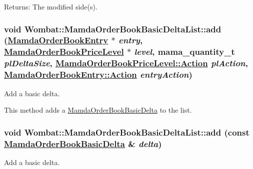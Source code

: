 \begin{Desc}
\item[Returns:]The modified side(s). \end{Desc}
\hypertarget{classWombat_1_1MamdaOrderBookBasicDeltaList_6395c7929cb591aac5b91721fd11f163}{
\subsubsection[add]{\setlength{\rightskip}{0pt plus 5cm}void Wombat::Mamda\-Order\-Book\-Basic\-Delta\-List::add (\hyperlink{classWombat_1_1MamdaOrderBookEntry}{Mamda\-Order\-Book\-Entry} $\ast$ {\em entry}, \hyperlink{classWombat_1_1MamdaOrderBookPriceLevel}{Mamda\-Order\-Book\-Price\-Level} $\ast$ {\em level}, mama\_\-quantity\_\-t {\em pl\-Delta\-Size}, \hyperlink{classWombat_1_1MamdaOrderBookPriceLevel_bd3407b4250fc6f7a42d94b6d32e358a}{Mamda\-Order\-Book\-Price\-Level::Action} {\em pl\-Action}, \hyperlink{classWombat_1_1MamdaOrderBookEntry_fc6cb1d67c7601d093a36f59cf9bcef4}{Mamda\-Order\-Book\-Entry::Action} {\em entry\-Action})}}
\label{classWombat_1_1MamdaOrderBookBasicDeltaList_6395c7929cb591aac5b91721fd11f163}


Add a basic delta. 

This method adds a \hyperlink{classWombat_1_1MamdaOrderBookBasicDelta}{Mamda\-Order\-Book\-Basic\-Delta} to the list. \hypertarget{classWombat_1_1MamdaOrderBookBasicDeltaList_875c4dd8f93d32b261c95116336788ce}{
\subsubsection[add]{\setlength{\rightskip}{0pt plus 5cm}void Wombat::Mamda\-Order\-Book\-Basic\-Delta\-List::add (const \hyperlink{classWombat_1_1MamdaOrderBookBasicDelta}{Mamda\-Order\-Book\-Basic\-Delta} \& {\em delta})}}
\label{classWombat_1_1MamdaOrderBookBasicDeltaList_875c4dd8f93d32b261c95116336788ce}


Add a basic delta. 

